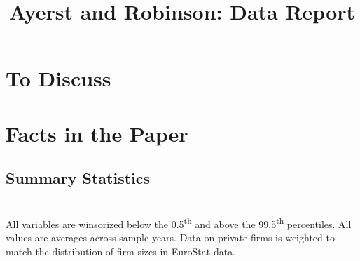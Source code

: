\documentclass[12pt,notitlepage]{article}
\title{Ayerst and Robinson: Data Report}
\author{}
\date{}
\begin{document}
\maketitle
\tableofcontents
\listoffigures
\FloatBarrier

\section{To Discuss} %
\label{sec:To_Discuss}



\section{Facts in the Paper} %
\label{sec:paper}


\FloatBarrier
\subsection{Summary Statistics} %
\label{sec:summary_statistics}
\FloatBarrier

\begin{table}[!htpb]
\caption{French Summary Statistics}
\tabularnewline \\
All variables are winsorized below the 0.5\textsuperscript{th} and above the 99.5\textsuperscript{th} percentiles. All values are averages across sample years. Data on private firms is weighted to match the distribution of firm sizes in EuroStat data.
\end{table}
\end{document}

